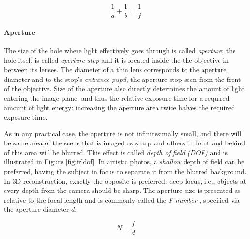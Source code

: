 \begin{equation} \label{eq:thinlens}
	\frac{1}{a} + \frac{1}{b} = \frac{1}{f}
\end{equation}





\paragraph{Aperture}
The size of the hole where light effectively goes through is called \emph{aperture}; the hole itself is called \emph{aperture stop} and it is located inside the the objective in between its lenses.
The diameter of a thin lens corresponds to the aperture diameter and to the stop's \emph{entrance pupil}, the aperture stop seen from the front of the objective.
Size of the aperture also directly determines the amount of light entering the image plane, and thus the relative exposure time for a required amount of light energy: increasing the aperture area twice halves the required exposure time.
\cite{greenleaf1950photographic}

As in any practical case, the aperture is not infinitesimally small, and there will be some area of the scene that is imaged as sharp and others in front and behind of this area will be blurred.
This effect is called \emph{depth of field (DOF)} and is illustrated in Figure \ref{fig:irldof}.
In artistic photos, a \emph{shallow} depth of field can be preferred, having the subject in focus to separate it from the blurred background.
In 3D reconstruction, exactly the opposite is preferred: deep focus, i.e., objects at every depth from the camera should be sharp.
The aperture size is presented as relative to the focal length and is commonly called the \emph{F number} \cite{szeliski10vision,greenleaf1950photographic}, specified via the aperture diameter $d$:

\begin{equation} \label{eq:fnumber}
	N = \frac{f}{d}
\end{equation}

